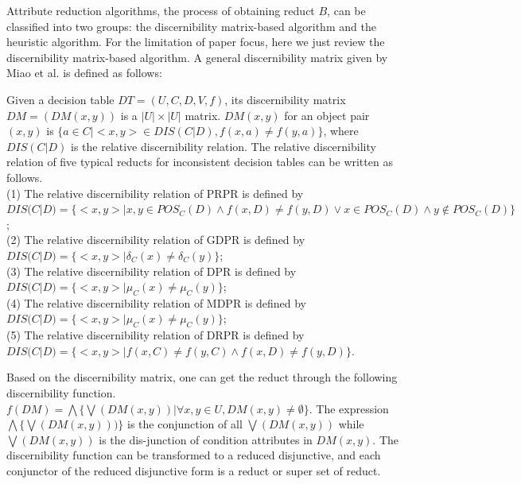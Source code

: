 \documentclass[review]{elsarticle}
\begin{document}
	\par Attribute reduction algorithms, the process of obtaining reduct $B$, can be classified into two groups: the discernibility matrix-based algorithm and the heuristic algorithm. For the limitation of paper focus, here we just review the discernibility matrix-based algorithm. A general discernibility matrix given by Miao et al. \cite{miao2009relative} is defined as follows:
	\par Given a decision table $DT=(U,C,D,V,f)$, its discernibility matrix $DM=(DM(x,y))$ is a $|U| \times |U|$ matrix. $DM(x,y)$ for an object pair $(x,y)$ is $\{a \in C|<x,y> \in DIS(C|D), f(x,a)\neq f(y,a)\}$, where $DIS(C|D)$ is the relative discernibility relation. The relative discernibility relation of five typical reducts for inconsistent decision tables can be written as follows.
	\\\rm{(1)} The relative discernibility relation of PRPR is defined by $DIS(C|D)=\{<x,y>|x,y \in POS_C(D) \wedge f(x,D)\neq f(y,D) \vee x \in POS_C(D) \wedge y \not \in POS_C(D) \}$;
	\\\rm{(2)} The relative discernibility relation of GDPR is defined by $DIS(C|D)=\{<x,y>| \delta_{C}(x) \neq \delta_{C}(y)\}$;
	\\\rm{(3)} The relative discernibility relation of DPR is defined by $DIS(C|D)=\{<x,y>|\mu_{C}(x)\neq \mu_{C}(y)\}$;
	\\\rm{(4)} The relative discernibility relation of MDPR is defined by $DIS(C|D)=\{<x,y>| \mu_{C}(x)\neq \mu_{C}(y)\}$;
	\\\rm{(5)} The relative discernibility relation of DRPR is defined by $DIS(C|D)=\{<x,y>| f(x,C)\neq f(y,C) \wedge f(x,D) \neq f(y,D)\}$.
	\par Based on the discernibility matrix, one can get the reduct through the following discernibility function. $f(DM)=\bigwedge \{\bigvee(DM(x,y))| \forall x,y \in U, DM(x,y) \neq \emptyset\}$. The expression $\bigwedge \{\bigvee(DM(x,y)))\}$ is the conjunction of all $\bigvee(DM(x,y))$ while $\bigvee(DM(x,y))$ is the dis-junction of condition attributes in $DM(x,y)$. The discernibility function can be transformed to a reduced disjunctive, and each conjunctor of the reduced disjunctive form is a reduct or super set of reduct.
\end{document}
